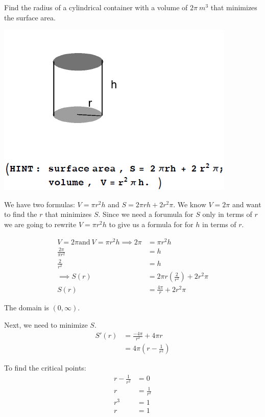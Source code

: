\documentclass[nooutcomes]{ximera}
\begin{document}
\begin{problem}
Find the radius of a cylindrical container with a volume of $2 \pi\ m^3$ that minimizes the surface area.


  \begin{image}
    \includegraphics[scale = 0.6]{Images/figure1.png}
  \end{image}

\begin{freeResponse}

We have two formulas: $V=\pi r^2h$ and $S=2 \pi rh+2r^2\pi$.  We know $V=2\pi$ and want to find the $r$ that minimizes $S$.  Since we need a forumula for $S$ only in terms of $r$ we are going to rewrite $V=\pi r^2h$ to give us a formula for for $h$ in terms of $r$.

\begin{align*}
V=2\pi \text{and}\ V=\pi r^2h \implies 2\pi &= \pi r^2h\\
\frac{2\pi}{\pi r^2}&=h\\
\frac{2}{r^2}&=h\\
\implies S(r)&=2 \pi r\left(\frac{2}{r^2}\right)+2r^2\pi\\
S(r)&=\frac{4\pi}{r}+2r^2\pi
\end{align*}

The domain is $(0,\infty)$.

Next, we need to minimize $S$.
\begin{align*}
S'(r)&=\frac{-4\pi}{r^2}+4\pi r\\
&=4\pi \left(r-\frac{1}{r^2}\right)
\end{align*}

To find the critical points:
\begin{align*}
r-\frac{1}{r^2}&=0\\
r&=\frac{1}{r^2}\\
r^3&=1\\
r&=1
\end{align*}


\end{freeResponse}
\end{problem}
\end{document}
